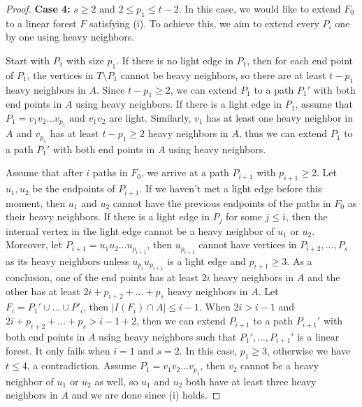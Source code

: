 \documentclass[12pt]{article}
\begin{document}
\begin{proof}
    
    \textbf{Case 4:} $s \ge 2$ and $2 \le p_1 \le t-2$.
    In this case, we would like to extend $F_0$ to a linear forest $F$ satisfying (i).
    To achieve this, we aim to extend every $P_i$ one by one using heavy neighbors.

    Start with $P_1$ with size $p_1$.
    If there is no light edge in $P_1$, then for each end point of $P_1$, the vertices in $T\setminus P_1$ cannot be heavy neighbors, so there are at least $t - p_1$ heavy neighbors in $A$.
    Since $t - p_1 \ge 2$, we can extend $P_1$ to a path $P_1'$ with both end points in $A$ using heavy neighbors.
    If there is a light edge in $P_1$, assume that $P_1 = v_1v_2\ldots v_{p_1}$ and $v_{1}v_{2}$ are light.
    Similarly, $v_1$ has at least one heavy neighbor in $A$ and $v_{p_1}$ has at least $t - p_1 \ge 2$ heavy neighbors in $A$, thus we can extend $P_1$ to a path $P_1'$ with both end points in $A$ using heavy neighbors.

    Assume that after $i$ paths in $F_0$, we arrive at a path $P_{i+1}$ with $p_{i+1} \ge 2$. 
    Let $u_1,u_2$ be the endpoints of $P_{i+1}$.
    If we haven't met a light edge before this moment, then $u_1$ and $u_2$ cannot have the previous endpoints of the paths in $F_0$ as their heavy neighbors.
    If there is a light edge in $P_{j}$ for some $j \le i$, then the internal vertex in the light edge cannot be a heavy neighbor of $u_1$ or $u_2$.
    Moreover, let $P_{i+1} = u_1u_2\ldots u_{p_{i+1}}$, then $u_{p_{i+1}}$ cannot have vertices in $P_{i+2}, \ldots, P_{s}$ as its heavy neighbors unless $u_{p_{i}}u_{p_{i+1}}$ is a light edge and $p_{i+1} \ge 3$.
    As a conclusion, one of the end points has at least $2i$ heavy neighbors in $A$ and the other has at least $2i + p_{i+2} + \ldots + p_{s}$ heavy neighbors in $A$.
    Let $F_i=P_1'\cup\dots \cup P'_{i}$, then $|I(F_i)\cap A|\leq i-1$.
    When $2i > i-1$ and $2i + p_{i+2} + \ldots + p_{s} > i-1 +2$, then we can extend $P_{i+1}$ to a path $P_{i+1}'$ with both end points in $A$ using heavy neighbors such that $P_1', \ldots, P_{i+1}'$ is a linear forest.
    It only fails when $i=1$ and $s=2$.
    In this case, $p_1 \ge 3$, otherwise we have $t \le 4$, a contradiction.
    Assume $P_1 = v_1v_2\ldots v_{p_1}$, then $v_2$ cannot be a heavy neighbor of $u_1$ or $u_2$ as well, so $u_1$ and $u_2$ both have at least three heavy neighbors in $A$ and we are done since (i) holds.
    

\end{proof}
\end{document}
